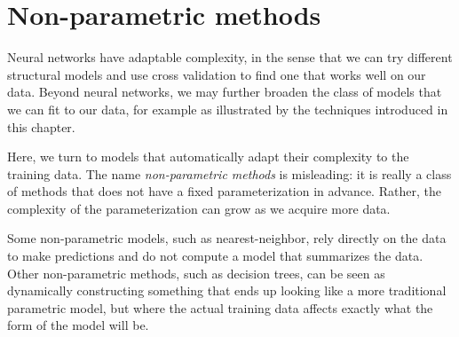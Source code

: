 \chapter{Non-parametric methods}
\label{chap-nonparametric}

Neural networks have adaptable complexity, in the sense that we can
try different structural models and use cross validation to find one
that works well on our data.  Beyond neural networks, we may further
broaden the class of models that we can fit to our data, for example
as illustrated by the techniques introduced in this chapter.

Here, we turn to models that automatically adapt their complexity to
the training data.  The name {\em non-parametric
    methods} is misleading: it is really a
class of methods that does not have a fixed parameterization in
advance.  Rather, the complexity of the parameterization can grow as
we acquire more data.

Some non-parametric models, such as nearest-neighbor, rely directly on the
data to make predictions and do not compute a model that summarizes
the data. Other non-parametric methods, such as decision trees,
can be seen as
dynamically constructing something that ends up looking like a more
traditional parametric model, but where the actual training data
affects exactly what the form of the model will be.

